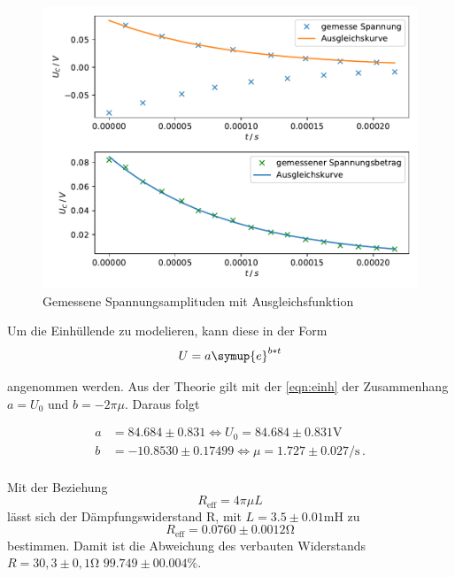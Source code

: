 \newpage
\begin{figure}
    \centering
    \label{fig:1}
    \includegraphics{Daten/a.pdf}
    \caption{Gemessene Spannungsamplituden mit Ausgleichsfunktion}
\end{figure}

Um die Einhüllende zu modelieren, kann diese in der Form
\begin{equation}
    U = a \symup{e}^{b*t}
\end{equation}

\noindent
angenommen werden. Aus der Theorie gilt mit der \autoref{eqn:einh} der Zusammenhang $a = U_0$ und $b = -2 \pi \mu$. Daraus folgt %


\begin{align*}
    a &= 84.684 \pm 0.831 \Leftrightarrow U_0 = 84.684 \pm 0.831 \si{\volt} \\
    b &= -10.8530 \pm 0.17499 \Leftrightarrow \mu = 1.727 \pm 0.027 \si{\per\second} \, .\\
\end{align*}

Mit der Beziehung 
\begin{equation}
    R_\text{eff} = 4\pi\mu L 
\end{equation}
lässt sich der Dämpfungswiderstand R, mit $L = 3.5 \pm 0.01 \si{\milli\henry}$ zu
\begin{equation*}
    R_\text{eff} = 0.0760 \pm 0.0012 \si{\ohm}
\end{equation*}
bestimmen. Damit ist die Abweichung des verbauten Widerstands $R = 30,3 \pm 0,1 \si{\ohm}$ $99.749 \pm 00.004 \si{\percent}$.

